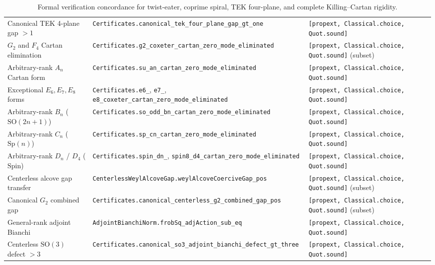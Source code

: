 \documentclass[11pt,a4paper]{article}
\begin{document}
\begin{table}[ht]
\begin{tabular}{@{}p{4.3cm}p{6.6cm}p{3.4cm}@{}}
Canonical TEK 4-plane gap $> 1$ & \texttt{Certificates.}\newline\texttt{canonical\_tek\_four\_plane\_gap\_gt\_one} & \texttt{[propext, Classical.choice,} \texttt{Quot.sound]} \\
$G_2$ and $F_4$ Cartan elimination & \texttt{Certificates.}\newline\texttt{g2\_coxeter\_cartan\_zero\_mode\_eliminated} & \texttt{[propext, Classical.choice,} \texttt{Quot.sound]} (subset) \\
Arbitrary-rank $A_n$ Cartan form & \texttt{Certificates.}\newline\texttt{su\_an\_cartan\_zero\_mode\_eliminated} & \texttt{[propext, Classical.choice,} \texttt{Quot.sound]} \\
Exceptional $E_6, E_7, E_8$ forms & \texttt{Certificates.}\newline\texttt{e6\_}, \texttt{e7\_}, \texttt{e8\_coxeter\_cartan\_zero\_mode\_eliminated} & \texttt{[propext, Classical.choice,} \texttt{Quot.sound]} \\
Arbitrary-rank $B_n$ ($\mathrm{SO}(2n+1)$) & \texttt{Certificates.}\newline\texttt{so\_odd\_bn\_cartan\_zero\_mode\_eliminated} & \texttt{[propext, Classical.choice,} \texttt{Quot.sound]} \\
Arbitrary-rank $C_n$ ($\mathrm{Sp}(n)$) & \texttt{Certificates.}\newline\texttt{sp\_cn\_cartan\_zero\_mode\_eliminated} & \texttt{[propext, Classical.choice,} \texttt{Quot.sound]} \\
Arbitrary-rank $D_n$ / $D_4$ ($\mathrm{Spin}$) & \texttt{Certificates.}\newline\texttt{spin\_dn\_}, \texttt{spin8\_d4\_cartan\_zero\_mode\_eliminated} & \texttt{[propext, Classical.choice,} \texttt{Quot.sound]} \\
Centerless alcove gap transfer & \texttt{CenterlessWeylAlcoveGap.}\newline\texttt{weylAlcoveCoerciveGap\_pos} & \texttt{[propext, Classical.choice,} \texttt{Quot.sound]} (subset) \\
Canonical $G_2$ combined gap & \texttt{Certificates.}\newline\texttt{canonical\_centerless\_g2\_combined\_gap\_pos} & \texttt{[propext, Classical.choice,} \texttt{Quot.sound]} (subset) \\
General-rank adjoint Bianchi & \texttt{AdjointBianchiNorm.}\newline\texttt{frobSq\_adjAction\_sub\_eq} & \texttt{[propext, Classical.choice,} \texttt{Quot.sound]} \\
Centerless $\mathrm{SO}(3)$ defect $> 3$ & \texttt{Certificates.}\newline\texttt{canonical\_so3\_adjoint\_bianchi\_defect\_gt\_three} & \texttt{[propext, Classical.choice,} \texttt{Quot.sound]} \\
\bottomrule
\end{tabular}
\caption{Formal verification concordance for twist-eater, coprime spiral, TEK four-plane, and complete Killing--Cartan rigidity.}
\label{tab:paper3-concordance}
\end{table}



\end{document}

